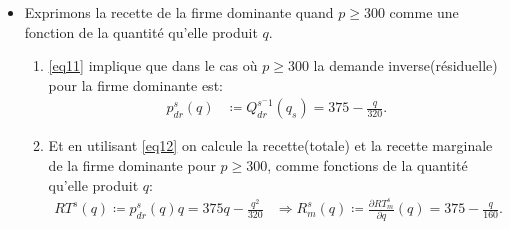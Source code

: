 \documentclass[notes, ignorenonframetext, compress, 9pt, xcolor=svgnames, aspectratio=169]{beamer}
\begin{document}
\begin{frame}
\begin{itemize}
\begin{align}
\begin{array}{ll}
60000 - 120p & \text{sinon}.
\end{array}\right.
\label{eq11}
\end{align}
\item Exprimons la recette de la firme dominante quand $p\geq 300$ comme une fonction de la quantité qu'elle produit $q$.
\begin{enumerate}[$\cdot$]
   \item \eqref{eq11}  implique que dans le cas où $p\geq 300$ la demande inverse(résiduelle) pour la firme dominante est:
   \begin{align}
   p_{dr}^s(q) &\coloneqq Q_{dr}^{s^-1}(q_s) = 375 - \frac{q}{320}\label{eq12}.
   \end{align} 
   \item Et en utilisant \eqref{eq12} on calcule la recette(totale) et  la recette marginale de la firme dominante pour $p\geq 300$, comme fonctions de la quantité qu'elle produit $q$:
   \begin{align}
   RT^s(q) \coloneqq  p_{dr}^s(q)q = 375q - \frac{q^2}{320}&\Rightarrow R^s_m(q) \coloneqq \frac{\partial RT_m^{s}}{\partial q}(q) = 375-  \frac{q}{160}.
   \label{eq13}
   \end{align}
\end{enumerate}
   \end{itemize}
 \end{frame}
 
\end{document}
